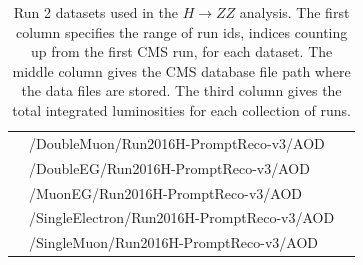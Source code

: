 \begin{table}[h]
\begin{tabular}{|l|l|l|}
& /DoubleMuon/Run2016H-PromptReco-v3/AOD &  \\ 
& /DoubleEG/Run2016H-PromptReco-v3/AOD &  \\ 
& /MuonEG/Run2016H-PromptReco-v3/AOD &  \\ 
& /SingleElectron/Run2016H-PromptReco-v3/AOD &  \\ 
& /SingleMuon/Run2016H-PromptReco-v3/AOD &  \\ 
\hline %
\hline %
     \end{tabular}
    \caption{Run 2 datasets used in the $H\rightarrow ZZ$ analysis. The first column specifies the range of run ids, indices counting up from the first CMS run, for each dataset. The middle column gives the CMS database file path where the data files are stored. The third column gives the total integrated luminosities for each collection of runs.}
    \label{tab:datasets_data}
\end{table}



